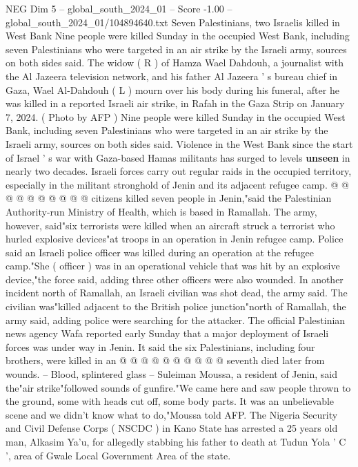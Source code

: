 \begin{textsample}{NEG Dim 5 – global\_south\_2024\_01 – Score -1.00 – global\_south\_2024\_01/104894640.txt}  \label{ex:f5_neg_444}
Seven Palestinians, two Israelis killed in West Bank Nine people were killed Sunday in the occupied West Bank, including seven Palestinians who were targeted in an air strike by the Israeli army, sources on both sides said.
The widow ( R ) of Hamza Wael Dahdouh, a journalist with the Al Jazeera television network, and his father Al Jazeera ' s bureau chief in Gaza, Wael Al-Dahdouh ( L ) mourn over his body during his funeral, after he was killed in a reported Israeli air strike, in Rafah in the Gaza Strip on January 7, 2024. ( Photo by AFP ) Nine people were killed Sunday in the occupied West Bank, including seven Palestinians who were targeted in an air strike by the Israeli army, sources on both sides said.
Violence in the West Bank since the start of Israel ' s war with Gaza-based Hamas militants has surged to levels \textbf{unseen} in nearly two decades.
Israeli forces carry out regular raids in the occupied territory, especially in the militant stronghold of Jenin and its adjacent refugee camp. @ @ @ @ @ @ @ @ @ @ citizens killed seven people in Jenin,"said the Palestinian Authority-run Ministry of Health, which is based in Ramallah.
The army, however, said"six terrorists were killed when an aircraft struck a terrorist who hurled explosive devices"at troops in an operation in Jenin refugee camp.
Police said an Israeli police officer was killed during an operation at the refugee camp."She ( officer ) was in an operational vehicle that was hit by an explosive device,"the force said, adding three other officers were also wounded.
In another incident north of Ramallah, an Israeli civilian was shot dead, the army said.
The civilian was"killed adjacent to the British police junction"north of Ramallah, the army said, adding police were searching for the attacker.
The official Palestinian news agency Wafa reported early Sunday that a major deployment of Israeli forces was under way in Jenin.
It said the six Palestinians, including four brothers, were killed in an @ @ @ @ @ @ @ @ @ @ seventh died later from wounds. -- Blood, splintered glass -- Suleiman Moussa, a resident of Jenin, said the"air strike"followed sounds of gunfire."We came here and saw people thrown to the ground, some with heads cut off, some body parts.
It was an unbelievable scene and we didn't know what to do,"Moussa told AFP.
The Nigeria Security and Civil Defense Corps ( NSCDC ) in Kano State has arrested a 25 years old man, Alkasim Ya'u, for allegedly stabbing his father to death at Tudun Yola ' C ', area of Gwale Local Government Area of the state.

\end{textsample}
